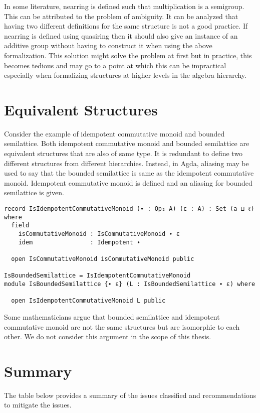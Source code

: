 In some literature, nearring is defined such that multiplication is a semigroup.
This can be attributed to the problem of ambiguity. It can be analyzed that
having two different definitions for the same structure is not a good practice.
If nearring is defined using quasiring then it should also give an instance of
an additive group without having to construct it when using the above
formalization. This solution might solve the problem at first but in practice,
this becomes tedious and may go to a point at which this can be impractical
especially when formalizing structures at higher levels in the algebra
hierarchy.

\section{Equivalent Structures}
Consider the example of idempotent commutative monoid and bounded semilattice.
Both idempotent commutative monoid and bounded semilattice are equivalent
structures that are also of same type. It is redundant to define two different
structures from different hierarchies. Instead, in Agda, aliasing may be used to
say that the bounded semilattice is same as the idempotent commutative monoid.
Idempotent commutative monoid is defined and an aliasing for bounded semilattice
is given.

\begin{verbatim}
record IsIdempotentCommutativeMonoid (∙ : Op₂ A) (ε : A) : Set (a ⊔ ℓ) where
  field
    isCommutativeMonoid : IsCommutativeMonoid ∙ ε
    idem                : Idempotent ∙

  open IsCommutativeMonoid isCommutativeMonoid public

IsBoundedSemilattice = IsIdempotentCommutativeMonoid
module IsBoundedSemilattice {∙ ε} (L : IsBoundedSemilattice ∙ ε) where

  open IsIdempotentCommutativeMonoid L public
\end{verbatim}

Some mathematicians argue that bounded semilattice and idempotent
commutative monoid are not the same structures but are isomorphic to each other.
We do not consider this argument in the scope of this thesis.

\section{Summary}
The table below provides a summary of the issues classified and recommendations
to mitigate the issues.

